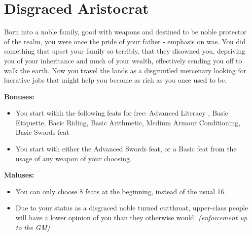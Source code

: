 \section{Disgraced Aristocrat}
Born into a noble family, good with weapons and destined to be noble protector of the realm, you were once the pride of your father - emphasis on was. You did something that upset your family so terribly, that they disowned you, depriving you of your inheritance and much of your wealth, effectively sending you off to walk the earth. Now you travel the lands as a disgruntled mercenary looking for lucrative jobs that might help you become as rich as you once used to be.


\textbf{Bonuses:}
\begin{itemize}
	\item You start withh the following feats for free: Advanced Literacy , Basic Etiquette, Basic Riding, Basic Arithmetic, Medium Armour Conditioning, Basic Swords feat
	\item You start with either the Advanced Swords feat, or a Basic feat from the usage of any weapon of your choosing.
\end{itemize}


\textbf{Maluses:}
\begin{itemize}
	\item You can only choose 8 feats at the beginning, instead of the usual 16.
	\item Due to your status as a disgraced noble turned cutthroat, upper-class people will have a lower opinion of you than they otherwise would. \textit{(enforcement up to the GM)}
\end{itemize}
